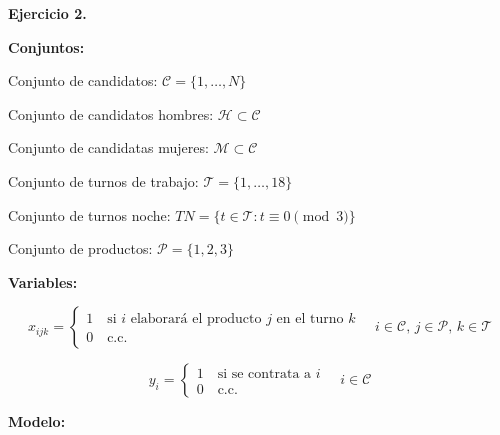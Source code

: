 \documentclass{article}
\begin{document}
\textbf{Ejercicio 2.}

\textbf{Conjuntos:}

Conjunto de candidatos: $\mathcal{C}=\{1,\dots, N\}$

Conjunto de candidatos hombres: $\mathcal{H}\subset \mathcal{C}$

Conjunto de candidatas mujeres: $\mathcal{M}\subset \mathcal{C}$

Conjunto de turnos de trabajo: $\mathcal{T}=\{1,\dots, 18\}$



Conjunto de turnos noche: $TN=\{t\in\mathcal{T}\colon t\equiv 0\pmod{3}\}$

Conjunto de productos: $\mathcal{P}=\{1,2,3\}$

\textbf{Variables:}

\[x_{ijk}=\begin{cases}
1 \quad \text{si $i$ elaborará el producto $j$ en el turno $k$}\\
0 \quad \text{c.c.}
\end{cases} \quad i\in\mathcal{C},\,j\in\mathcal{P},\,k\in\mathcal{T}\]

\[y_i=\begin{cases}
1 \quad \text{si se contrata a $i$}\\
0 \quad \text{c.c.}
\end{cases} \quad i\in \mathcal{C}\]

\textbf{Modelo:}
\end{document}

